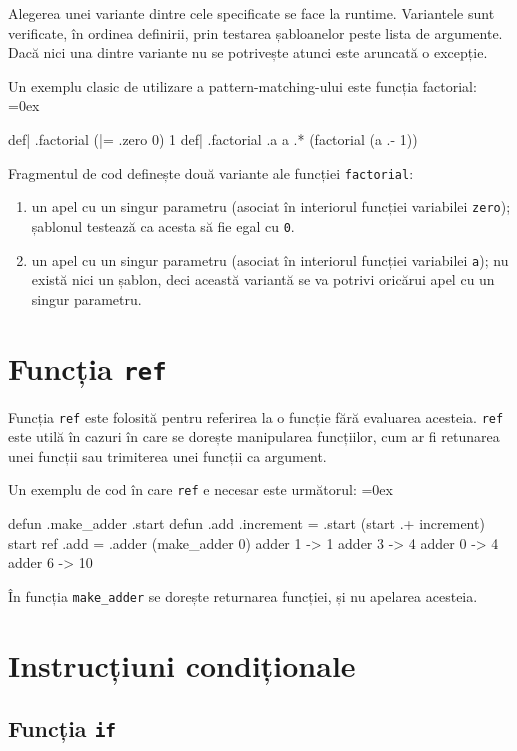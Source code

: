 \documentclass[12pt,a4paper]{memoir}
\renewcommand{\c}{\texttt}
\newenvironment{code}
{
\definecolor{shadecolor}{gray}{0.91}
\topsep=0ex
\relax
\shaded
\verbatim
}
{
\endverbatim
\endshaded
}
\begin{document}
Alegerea unei variante dintre cele specificate se face la runtime. Variantele sunt verificate, în ordinea definirii, prin testarea șabloanelor peste lista de argumente. Dacă nici una dintre variante nu se potrivește atunci este aruncată o excepție.

Un exemplu clasic de utilizare a pattern-matching-ului este funcția factorial:
\begin{code}
def| .factorial (|= .zero 0) { 1 }
def| .factorial .a { a .* (factorial (a .- 1)) }
\end{code}
Fragmentul de cod definește două variante ale funcției \c{factorial}:
\begin{enumerate}
\item un apel cu un singur parametru (asociat în interiorul funcției variabilei \c{zero}); șablonul testează ca acesta să fie egal cu \c{0}.
\item un apel cu un singur parametru (asociat în interiorul funcției variabilei \c{a}); nu există nici un șablon, deci această variantă se va potrivi oricărui apel cu un singur parametru.
\end{enumerate}

\section{Funcția \c{ref}}

Funcția \c{ref} este folosită pentru referirea la o funcție fără evaluarea acesteia. \c{ref} este utilă în cazuri în care se dorește manipularea funcțiilor, cum ar fi retunarea unei funcții sau trimiterea unei funcții ca argument. 

Un exemplu de cod în care \c{ref} e necesar este următorul:
\begin{code}
defun .make_adder .start {
  defun .add .increment {
    = .start (start .+ increment)
    start
  }
  ref .add
}
= .adder (make_adder 0)
adder 1 -> 1
adder 3 -> 4
adder 0 -> 4
adder 6 -> 10
\end{code}

În funcția \c{make\_adder} se dorește returnarea funcției, și nu apelarea acesteia.

\section{Instrucțiuni condiționale}

\subsection{Funcția \c{if}}
\end{document}
